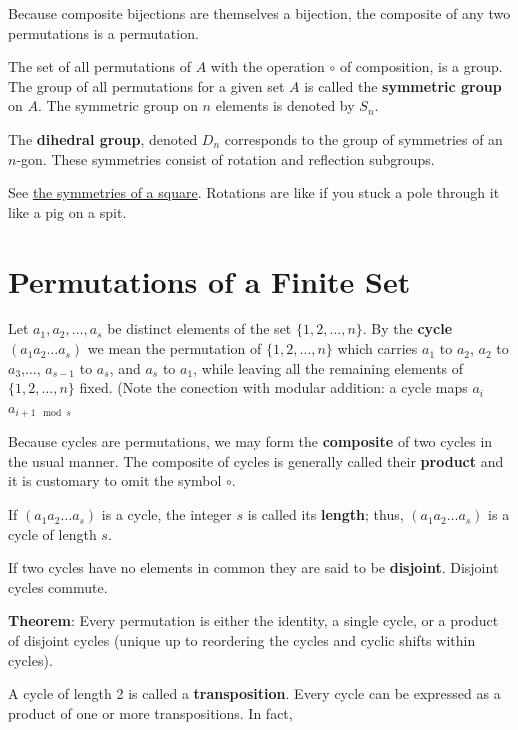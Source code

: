 \documentclass[11pt]{article}
\begin{document}
Because composite bijections are themselves a bijection, the composite
of any two permutations is a permutation.

The set of all permutations of \(A\) with the operation \(\circ\) of
composition, is a group. The group of all permutations for a given set
\(A\) is called the \textbf{symmetric group} on \(A\). The symmetric
group on \(n\) elements is denoted by \(S_n\).

The \textbf{dihedral group}, denoted \(D_n\) corresponds to the group of
symmetries of an \(n\)-gon. These symmetries consist of rotation and
reflection subgroups.

See
\href{https://proofwiki.org/wiki/Definition:Symmetry_Group_of_Square}{the
symmetries of a square}. Rotations are like if you stuck a pole through
it like a pig on a spit.

\section{Permutations of a Finite
Set}\label{permutations-of-a-finite-set}

Let \(a_1, a_2, \ldots, a_s\) be distinct elements of the set
\(\{1,2,\ldots, n\}\). By the \textbf{cycle} \((a_1a_2 \ldots a_s)\) we
mean the permutation of \(\{1,2,\ldots, n\}\) which carries \(a_1\) to
\(a_2\), \(a_2\) to \(a_3\),\(\ldots\), \(a_{s-1}\) to \(a_s\), and
\(a_s\) to \(a_1\), while leaving all the remaining elements of
\(\{1,2,\ldots,n\}\) fixed. (Note the conection with modular addition: a
cycle maps \(a_i\) \(a_{i+1 \mod s}\)

Because cycles are permutations, we may form the \textbf{composite} of
two cycles in the usual manner. The composite of cycles is generally
called their \textbf{product} and it is customary to omit the symbol
\(\circ\).

If \((a_1a_2 \ldots a_s)\) is a cycle, the integer \(s\) is called its
\textbf{length}; thus, \((a_1a_2 \ldots a_s)\) is a cycle of length
\(s\).

If two cycles have no elements in common they are said to be
\textbf{disjoint}. Disjoint cycles commute.

\textbf{Theorem}: Every permutation is either the identity, a single
cycle, or a product of disjoint cycles (unique up to reordering the
cycles and cyclic shifts within cycles).

A cycle of length 2 is called a \textbf{transposition}. Every cycle can
be expressed as a product of one or more transpositions. In fact,
\end{document}
